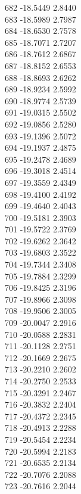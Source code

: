 \documentclass[11pt]{article}
\theoremstyle{definition}
\theoremstyle{plain}
\begin{document}
{682 -18.5449 2.8440\\
683 -18.5989 2.7987\\
684 -18.6530 2.7578\\
685 -18.7071 2.7207\\
686 -18.7612 2.6867\\
687 -18.8152 2.6553\\
688 -18.8693 2.6262\\
689 -18.9234 2.5992\\
690 -18.9774 2.5739\\
691 -19.0315 2.5502\\
692 -19.0856 2.5280\\
693 -19.1396 2.5072\\
694 -19.1937 2.4875\\
695 -19.2478 2.4689\\
696 -19.3018 2.4514\\
697 -19.3559 2.4349\\
698 -19.4100 2.4192\\
699 -19.4640 2.4043\\
700 -19.5181 2.3903\\
701 -19.5722 2.3769\\
702 -19.6262 2.3642\\
703 -19.6803 2.3522\\
704 -19.7344 2.3408\\
705 -19.7884 2.3299\\
706 -19.8425 2.3196\\
707 -19.8966 2.3098\\
708 -19.9506 2.3005\\
709 -20.0047 2.2916\\
710 -20.0588 2.2831\\
711 -20.1128 2.2751\\
712 -20.1669 2.2675\\
713 -20.2210 2.2602\\
714 -20.2750 2.2533\\
715 -20.3291 2.2467\\
716 -20.3832 2.2404\\
717 -20.4372 2.2345\\
718 -20.4913 2.2288\\
719 -20.5454 2.2234\\
720 -20.5994 2.2183\\
721 -20.6535 2.2134\\
722 -20.7076 2.2088\\
723 -20.7616 2.2044\\
}
\end{document}
